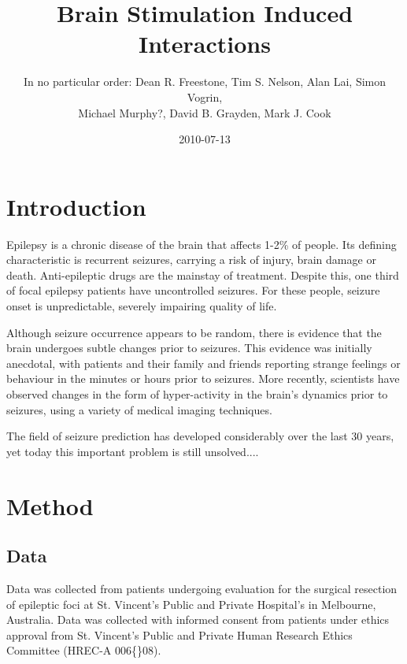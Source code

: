 \documentclass[]{article}
\title{Brain Stimulation Induced Interactions}
\author{In no particular order: Dean R. Freestone, Tim S. Nelson, Alan Lai, Simon Vogrin,\\
 Michael Murphy?, David B. Grayden, Mark J. Cook}
\date{2010-07-13}
\begin{document}
\ifpdf
{}
\else
{}
\fi

\maketitle


\begin{abstract}
\end{abstract}

\section{Introduction}
Epilepsy is a chronic disease of the brain that affects 1-2\% of people. Its defining characteristic is recurrent seizures, carrying a risk of injury, brain damage or death. Anti-epileptic drugs are the mainstay of treatment.  Despite this, one third of focal epilepsy patients have uncontrolled seizures. For these people, seizure onset is unpredictable, severely impairing quality of life.

Although seizure occurrence appears to be random, there is evidence that the brain undergoes subtle changes prior to seizures. This evidence was initially anecdotal, with patients and their family and friends reporting strange feelings or behaviour in the minutes or hours prior to seizures. More recently, scientists have observed changes in the form of hyper-activity in the brain’s dynamics prior to seizures, using a variety of medical imaging techniques.

The field of seizure prediction has developed considerably over the last 30 years, yet today this important problem is still unsolved....

\section{Method}

\subsection{Data}
Data was collected from patients undergoing  evaluation for the surgical resection of epileptic foci at St. Vincent's Public and Private Hospital's in Melbourne, Australia. Data was collected with informed consent from patients under ethics approval from St. Vincent's Public and Private Human Research Ethics Committee (HREC-A 006\{\}08). 


\end{document}
